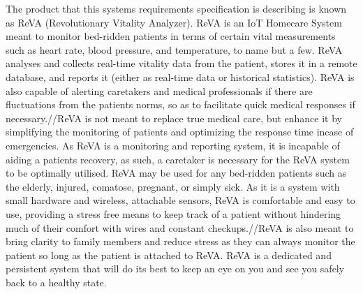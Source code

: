 The product that this systems requirements specification is describing is known as ReVA (Revolutionary Vitality Analyzer).
ReVA is an IoT Homecare System meant to monitor bed-ridden patients in terms of certain vital measurements such as heart rate, blood pressure,
and temperature, to name but a few. ReVA analyses and collects real-time vitality data from the patient, stores it in a remote database, and
reports it (either as real-time data or historical statistics). ReVA is also capable of alerting caretakers and medical professionals if there 
are fluctuations from the patients norms, so as to facilitate quick medical responses if necessary.//ReVA is not meant to replace true medical 
care, but enhance it by simplifying the monitoring of patients and optimizing the response time incase of emergencies. As ReVA is a 
monitoring and reporting system, it is incapable of aiding a patients recovery, as such, a caretaker is necessary for the ReVA system 
to be optimally utilised. ReVA may be used for any bed-ridden patients such as the elderly, injured, comatose, pregnant, or simply sick. As it 
is a system with small hardware and wireless, attachable sensors, ReVA is comfortable and easy to use, providing a stress free means to keep track 
of a patient without hindering much of their comfort with wires and constant checkups.//ReVA is also meant to bring clarity to family members 
and reduce stress as they can always monitor the patient so long as the patient is attached to ReVA. ReVA is a dedicated and persistent 
system that will do its best to keep an eye on you and see you safely back to a healthy state. 
